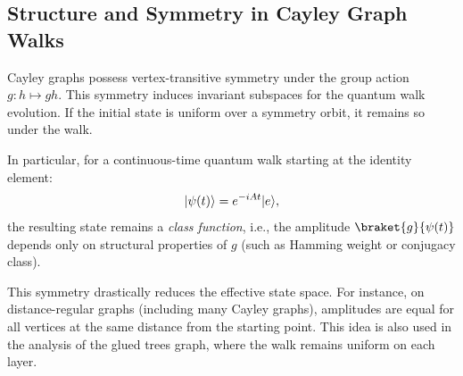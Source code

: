 \documentclass[12pt]{report}
\begin{document}




\subsection{Structure and Symmetry in Cayley Graph Walks}

Cayley graphs possess vertex-transitive symmetry under the group action $g : h \mapsto gh$. This symmetry induces invariant subspaces for the quantum walk evolution. If the initial state is uniform over a symmetry orbit, it remains so under the walk.

In particular, for a continuous-time quantum walk starting at the identity element:
\[
\lvert\psi(t)\rangle = e^{-iAt} \lvert e\rangle,
\]
the resulting state remains a \emph{class function}, i.e., the amplitude $\braket{g}{\psi(t)}$ depends only on structural properties of $g$ (such as Hamming weight or conjugacy class).

This symmetry drastically reduces the effective state space. For instance, on distance-regular graphs (including many Cayley graphs), amplitudes are equal for all vertices at the same distance from the starting point. This idea is also used in the analysis of the glued trees graph, where the walk remains uniform on each layer.


\end{document}
